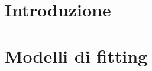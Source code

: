 


\maketitle
\clearpage

\tableofcontents
\clearpage

\section{Introduzione}


\section{Modelli di fitting}





